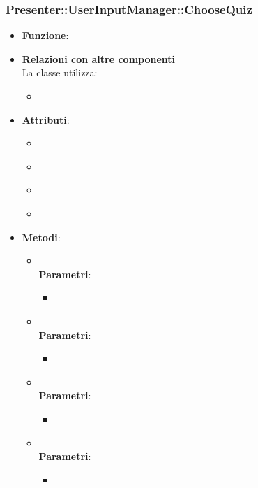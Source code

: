 \subsubsection{Presenter::UserInputManager::ChooseQuiz}
\begin{itemize}
\item\textbf{Funzione}:
\item\textbf{Relazioni con altre componenti}\\
La classe utilizza:
	\begin{itemize}
		\item
	\end{itemize}
\item\textbf{Attributi}:
	\begin{itemize}
		\item\code{}\\
		\item\code{}\\
		\item\code{}\\
		\item\code{}\\
	\end{itemize}
\item\textbf{Metodi}:
	\begin{itemize}
		\item\code{}\\
		\textbf{Parametri}:
			\begin{itemize}
				\item\code{}\\
			\end{itemize}
		\item\code{}\\
		\textbf{Parametri}:
			\begin{itemize}
				\item\code{}\\
			\end{itemize}
		\item\code{}\\
		\textbf{Parametri}:
			\begin{itemize}
				\item\code{}\\
			\end{itemize}
		\item\code{}\\
		\textbf{Parametri}:
			\begin{itemize}
				\item\code{}\\
			\end{itemize}
	\end{itemize}
\end{itemize}

